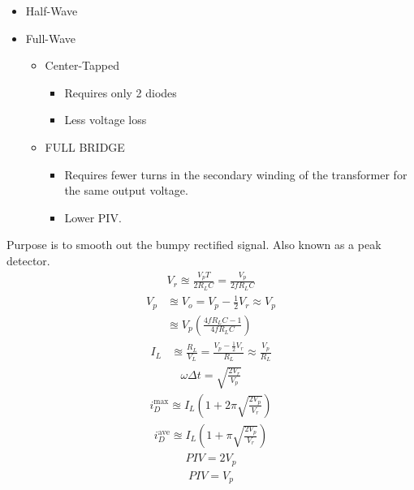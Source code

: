 \documentclass{article}
\begin{document}
\begin{itemize}
\item Half-Wave
\item Full-Wave
  \begin{itemize}
  \item Center-Tapped
    \begin{itemize}
    \item Requires only 2 diodes
    \item Less voltage loss
    \end{itemize}
  \item FULL BRIDGE
    \begin{itemize}
    \item Requires fewer turns in the secondary winding of the transformer for the same
      output voltage.
    \item Lower PIV.
    \end{itemize}
  \end{itemize}
\end{itemize}
Purpose is to smooth out the bumpy rectified signal. Also known as a peak detector.
\gap
{}
\begin{align*}
  V_r \approxeq \frac{V_p T}{2 R_L C} = \frac{V_p}{2fR_L C}
\end{align*}
\begin{align*}
  V_p &\approxeq V_o = V_p - \frac{1}{2}V_r \approx V_p\\
  &\approxeq V_p \left(\frac{4fR_LC - 1}{4fR_LC}\right)
\end{align*}
\begin{align*}
  I_L &\approxeq \frac{R_L}{V_L} = \frac{V_p - \frac{1}{2}V_r}{R_L} \approx \frac{V_p}{R_L}
\end{align*}
\begin{align*}
  \omega \Delta t = \sqrt{\frac{2V_r}{V_p}}
\end{align*}
\begin{align*}
  i_D^\text{max} \approxeq I_L\left(1 + 2\pi \sqrt{\frac{2V_p}{V_r}}\right)
\end{align*}
\begin{align*}
  i_D^\text{ave} \approxeq I_L\left(1 + \pi \sqrt{\frac{2V_p}{V_r}}\right)
\end{align*}
\begin{align*}
  PIV = 2V_p
\end{align*}
\begin{align*}
  PIV = V_p
\end{align*}
\end{document}
